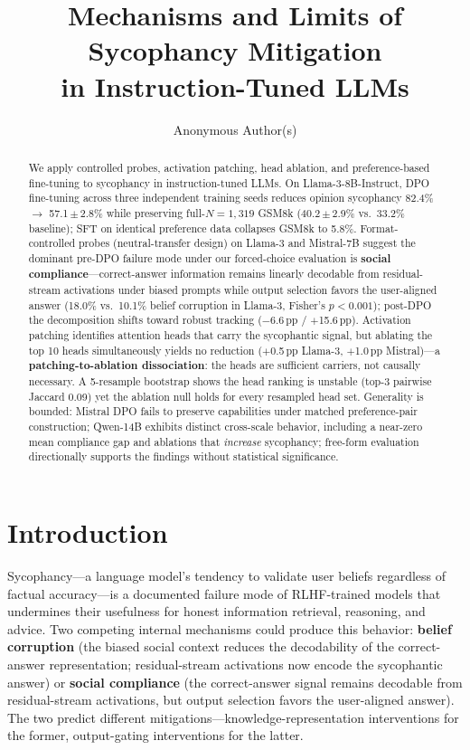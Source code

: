 \documentclass{article}
\title{Mechanisms and Limits of Sycophancy Mitigation\\in Instruction-Tuned LLMs}
\author{Anonymous Author(s)}
\begin{document}
\maketitle


\begin{abstract}
We apply controlled probes, activation patching, head ablation, and preference-based fine-tuning to sycophancy in instruction-tuned LLMs. On Llama-3-8B-Instruct, DPO fine-tuning across three independent training seeds reduces opinion sycophancy 82.4\% $\to$ 57.1\,$\pm$\,2.8\% while preserving full-$N{=}1{,}319$ GSM8k (40.2\,$\pm$\,2.9\% vs.\ 33.2\% baseline); SFT on identical preference data collapses GSM8k to 5.8\%. Format-controlled probes (neutral-transfer design) on Llama-3 and Mistral-7B suggest the dominant pre-DPO failure mode under our forced-choice evaluation is \textbf{social compliance}---correct-answer information remains linearly decodable from residual-stream activations under biased prompts while output selection favors the user-aligned answer (18.0\% vs.\ 10.1\% belief corruption in Llama-3, Fisher's $p<0.001$); post-DPO the decomposition shifts toward robust tracking ($-$6.6\,pp / $+$15.6\,pp). Activation patching identifies attention heads that carry the sycophantic signal, but ablating the top 10 heads simultaneously yields no reduction ($+$0.5\,pp Llama-3, $+$1.0\,pp Mistral)---a \textbf{patching-to-ablation dissociation}: the heads are sufficient carriers, not causally necessary. A 5-resample bootstrap shows the head ranking is unstable (top-3 pairwise Jaccard 0.09) yet the ablation null holds for every resampled head set. Generality is bounded: Mistral DPO fails to preserve capabilities under matched preference-pair construction; Qwen-14B exhibits distinct cross-scale behavior, including a near-zero mean compliance gap and ablations that \emph{increase} sycophancy; free-form evaluation directionally supports the findings without statistical significance.
\end{abstract}

\section{Introduction}
\label{sec:intro}

Sycophancy---a language model's tendency to validate user beliefs regardless of factual accuracy---is a documented failure mode of RLHF-trained models \citep{perez2022discovering, sharma2024towards} that undermines their usefulness for honest information retrieval, reasoning, and advice. Two competing internal mechanisms could produce this behavior: \textbf{belief corruption} (the biased social context reduces the decodability of the correct-answer representation; residual-stream activations now encode the sycophantic answer) or \textbf{social compliance} (the correct-answer signal remains decodable from residual-stream activations, but output selection favors the user-aligned answer). The two predict different mitigations---knowledge-representation interventions for the former, output-gating interventions for the latter.
\end{document}
